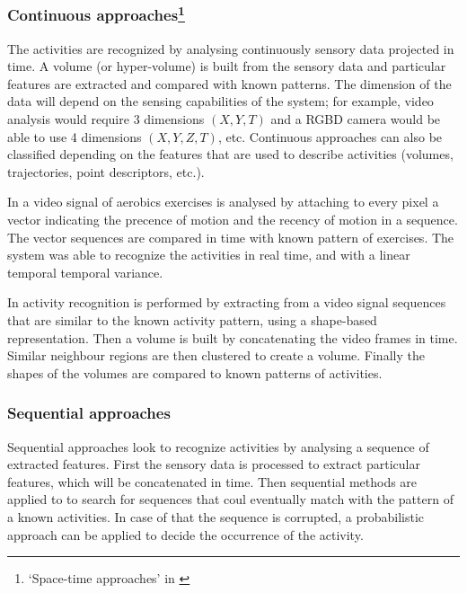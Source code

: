\documentclass[a4paper, 12pt, openany, oneside]{book}
\begin{document}
\subsubsection{Continuous approaches\footnote{`Space-time approaches' in \citep{Aggarwal11_HumanActivity}}} %

The activities are recognized by analysing continuously sensory data projected in time. 
A volume (or hyper-volume) is built from the sensory data and particular features are extracted and compared with known patterns.
The dimension of the data will depend on the sensing capabilities of the system; for example, video analysis would require 3 dimensions $(X,Y,T)$ and a RGBD camera would be able to use 4 dimensions $(X,Y,Z,T)$, etc. %
Continuous approaches can also be classified depending on the features that are used to describe activities (volumes, trajectories, point descriptors, etc.).

In \citep{Bobick2001_RecHuMovTemp} a video signal of aerobics exercises is analysed by attaching to every pixel a vector indicating the precence of motion and the recency of motion in a sequence. 
The vector sequences are compared in time with known pattern of exercises. 
The system was able to recognize the activities in real time, and with a linear temporal temporal variance. 

In \citep{Ke2007_SpTmpShapeAR} activity recognition is performed by extracting from a video signal sequences that are similar to the known activity pattern, using a shape-based representation. 
Then a volume is built by concatenating the video frames in time. Similar neighbour regions are then clustered to create a volume. 
Finally the shapes of the volumes are compared to known patterns of activities.


\subsubsection{Sequential approaches} %
Sequential approaches look to recognize activities by analysing a sequence of extracted features. First the sensory data is processed to extract particular features, which will be concatenated in time. Then sequential methods are applied to to search for sequences that coul eventually match with the pattern of a known activities. In case of that the sequence is corrupted, a probabilistic approach can be applied to decide the occurrence of the activity.
\end{document}
